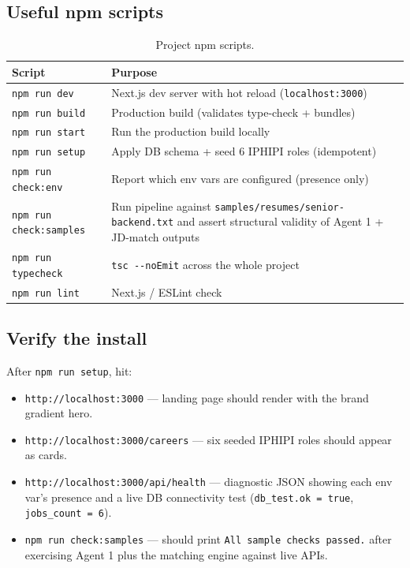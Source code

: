 \documentclass[11pt,a4paper]{article}
\begin{document}
\subsection{Useful npm scripts}

\begin{table}[h]
\centering
\renewcommand{\arraystretch}{1.25}
\begin{tabular}{@{}lp{10.5cm}@{}}
\toprule
\textbf{Script} & \textbf{Purpose} \\
\midrule
\texttt{npm run dev}            & Next.js dev server with hot reload (\texttt{localhost:3000}) \\
\texttt{npm run build}          & Production build (validates type-check + bundles) \\
\texttt{npm run start}          & Run the production build locally \\
\texttt{npm run setup}          & Apply DB schema + seed 6 IPHIPI roles (idempotent) \\
\texttt{npm run check:env}      & Report which env vars are configured (presence only) \\
\texttt{npm run check:samples}  & Run pipeline against \texttt{samples/resumes/senior-backend.txt} and assert structural validity of Agent 1 + JD-match outputs \\
\texttt{npm run typecheck}      & \texttt{tsc -{}-noEmit} across the whole project \\
\texttt{npm run lint}           & Next.js / ESLint check \\
\bottomrule
\end{tabular}
\caption{Project npm scripts.}
\end{table}

\subsection{Verify the install}

After \texttt{npm run setup}, hit:
\begin{itemize}
  \item \texttt{http://localhost:3000} --- landing page should render
        with the brand gradient hero.
  \item \texttt{http://localhost:3000/careers} --- six seeded IPHIPI roles
        should appear as cards.
  \item \texttt{http://localhost:3000/api/health} --- diagnostic JSON
        showing each env var's presence and a live DB connectivity test
        (\texttt{db\_test.ok = true}, \texttt{jobs\_count = 6}).
  \item \texttt{npm run check:samples} --- should print
        \texttt{All sample checks passed.} after exercising Agent 1 plus
        the matching engine against live APIs.
\end{itemize}
\end{document}
